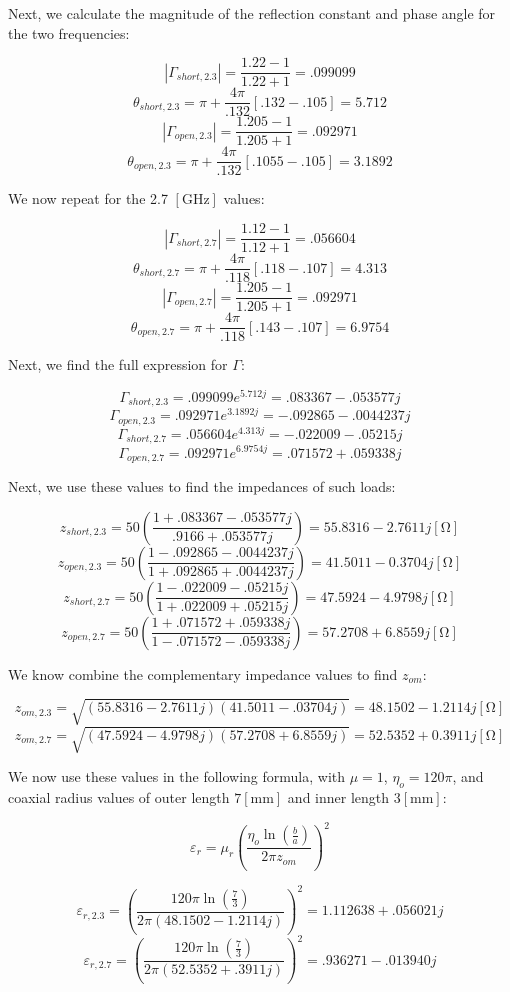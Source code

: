 \documentclass[
	letterpaper, %
	10pt, %
]{CSUniSchoolLabReport}
\begin{document}
Next, we calculate the magnitude of the reflection constant and phase angle for the two frequencies:

$$|\Gamma_{short,2.3}|=\frac{1.22-1}{1.22+1}=.099099$$
$$\theta_{short,2.3}=\pi+\frac{4\pi}{.132}\left[ .132-.105 \right]=5.712$$
$$|\Gamma_{open,2.3}|=\frac{1.205-1}{1.205+1}=.092971$$
$$\theta_{open,2.3}=\pi+\frac{4\pi}{.132}\left[ .1055-.105 \right]=3.1892$$

We now repeat for the 2.7 $[\si{\giga\hertz}]$ values:

$$|\Gamma_{short,2.7}|=\frac{1.12-1}{1.12+1}=.056604$$
$$\theta_{short,2.7}=\pi+\frac{4\pi}{.118}\left[ .118-.107\right]=4.313$$
$$|\Gamma_{open,2.7}|=\frac{1.205-1}{1.205+1}=.092971$$
$$\theta_{open,2.7}=\pi+\frac{4\pi}{.118}\left[ .143-.107 \right]=6.9754$$

Next, we find the full expression for $\Gamma$:

$$\Gamma_{short,2.3}=.099099e^{5.712j}=.083367-.053577j$$
$$\Gamma_{open,2.3}=.092971e^{3.1892j}=-.092865-.0044237j$$
$$\Gamma_{short,2.7}=.056604e^{4.313j}=-.022009-.05215j$$
$$\Gamma_{open,2.7}=.092971e^{6.9754j}=.071572+.059338j$$

Next, we use these values to find the impedances of such loads:

$$z_{short,2.3}=50\left( \frac{1+.083367-.053577j}{.9166+.053577j} \right)=55.8316-2.7611j[\si{\ohm}]$$
$$z_{open,2.3}=50\left(\frac{1-.092865-.0044237j}{1+.092865+.0044237j}\right)=41.5011-0.3704j[\si{\ohm}]$$
$$z_{short,2.7}=50\left( \frac{1-.022009-.05215j}{1+.022009+.05215j} \right)=47.5924-4.9798j[\si{\ohm}]$$
$$z_{open,2.7}=50\left( \frac{1+.071572+.059338j}{1-.071572-.059338j} \right)=57.2708+6.8559j[\si{\ohm}]$$

We know combine the complementary impedance values to find $z_{om}$:

$$z_{om,2.3}=\sqrt{(55.8316-2.7611j)(41.5011-.03704j)}=48.1502-1.2114j[\si{\ohm}]$$
$$z_{om,2.7}=\sqrt{(47.5924-4.9798j)(57.2708+6.8559j)}=52.5352+0.3911j[\si{\ohm}]$$

We now use these values in the following formula, with $\mu=1$, $\eta_o=120\pi$, and coaxial radius values of outer length $7[\si{\milli\meter}]$ and inner length $3[\si{\milli\meter}]$:

$$\varepsilon_r=\mu_r\left(  \frac{\eta_o\ln\left( \frac{b}{a} \right)}{2\pi z_{om}}\right)^2$$

$$\varepsilon_{r,2.3}=\left( \frac{120\pi\ln\left(\frac{7}{3}\right)}{2\pi(48.1502-1.2114j)} \right)^2=1.112638+.056021j$$
$$\varepsilon_{r,2.7}=\left( \frac{120\pi\ln\left(\frac{7}{3}\right)}{2\pi(52.5352+.3911j)} \right)^2=.936271-.013940j$$
\end{document}
